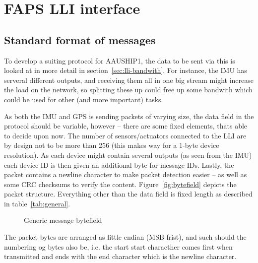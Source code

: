 
\chapter{FAPS LLI interface}
\section{Standard format of messages}
To develop a suiting protocol for AAUSHIP1, the data to be sent via this is looked at in more detail in section~\vref{sec:lli-bandwith}. For instance, the \ac{IMU} has serveral different outputs, and receiving them all in one big stream might increase the load on the network, so splitting these up could free up some bandwith which could be used for other (and more important) tasks. 

As both the \ac{IMU} and \ac{GPS} is sending packets of varying size, the data field in the protocol should be variable, however -- there are some fixed elements, thats able to decide upon now. The number of sensors/actuators connected to the \ac{LLI} are by design not to be more than 256 (this makes way for a 1-byte device resolution). As each device might contain several outputs (as seen from the \ac{IMU}) each device ID is then given an additional byte for message IDs. Lastly, the packet contains a newline character to make packet detection easier -- as well as some \ac{CRC} checksums to verify the content. Figure~\vref{fig:bytefield} depicts the packet structure. Everything other than the data field is fixed length as described in table~\vref{tab:general}.


\begin{figure}[h]
\centering
{}
\caption{Generic message bytefield}
\label{fig:bytefield}
\end{figure}

The packet bytes are arranged as little endian (MSB frist), and such should the numbering og bytes also be, i.e. the start start characther comes first when transmitted and ends with the end character which is the newline character.

